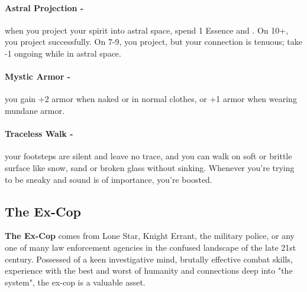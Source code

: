 \paragraph{Astral Projection -} when you project your spirit into astral space, spend 1 Essence and . On 10+, you project successfully. On 7-9, you project, but your connection is tenuous; take -1 ongoing while in astral space.

\paragraph{Mystic Armor -} you gain +2 armor when naked or in normal clothes, or +1 armor when wearing mundane armor.

\paragraph{Traceless Walk -} your footsteps are silent and leave no trace, and you can walk on soft or brittle surface like snow, sand or broken glass without sinking. Whenever you’re trying to be sneaky and sound is of importance, you’re boosted.



\clearpage
\subsection{The Ex-Cop}
\textbf{The Ex-Cop} comes from Lone Star, Knight Errant, the military police, or any one of many law enforcement agencies in the confused landscape of the late 21st century. Possessed of a keen investigative mind, brutally effective combat skills, experience with the best and worst of humanity and connections deep into "the system", the ex-cop is a valuable asset.


